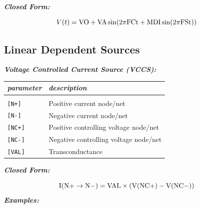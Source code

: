 \textbf{\textit{Closed Form:}}

  \[
    V(t)=\rm{VO}+\rm{VA}\sin(2\pi\rm{FC}t+\rm{MDI\sin(2\pi\rm{FS}t)}) \nonumber
  \]

%
%
%
%
\newpage
\subsection{Linear Dependent Sources}
\label{subsec_sceadm_lineardependentsources}

\textbf{\textit{Voltage Controlled Current Source (VCCS):}}


\begin{longtable}{l l}
\textit{parameter} & \textit{description} \\ \hline \\ \vspace{-0.8\parskip}
\texttt{[N+]} & Positive current node/net \\
\texttt{[N-]} & Negative current node/net \\
\texttt{[NC+]} & Positive controlling voltage node/net \\
\texttt{[NC-]} & Negative controlling voltage node/net \\
\texttt{[VAL]} & Transconductance
\end{longtable}

\textbf{\textit{Closed Form:}}

  \[
    \rm{I}(\rm{N+}\to\rm{N-})= \rm{VAL}\times(\rm{V}(\rm{NC+})-\rm{V}(\rm{NC-}))\nonumber
  \]
\textbf{\textit{Examples:}}

